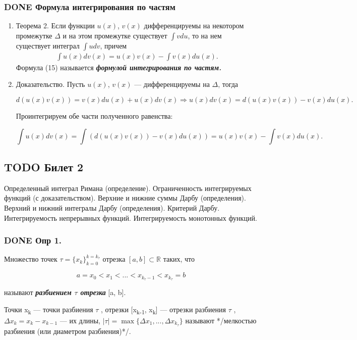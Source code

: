\documentclass[11pt]{article}
\begin{document}
\subsubsection{{\bfseries\sffamily DONE} Формула интегрирования по частям}
\label{sec:orge1b7a90}
\begin{enumerate}
\item Теорема 2.
\label{sec:org81cf2aa}
Если функции \(u(x)\), \(v(x)\) дифференцируемы на некотором промежутке
\(\Delta\) и на этом промежутке существует \(\int vdu\), то на нем существует интеграл 
\(\int udv\), причем
\begin{eqnarray}
\int u(x)dv(x)=u(x)v(x)-\int v(x)du(x).
\end{eqnarray}
Формула (15) называется \textbf{\emph{формулой интегрирования по частям.}}
\item Доказательство.
\label{sec:orgb06381d}
Пусть \(u(x)\), \(v(x)\) — дифференцируемы на \(\Delta\), тогда

$$
d(u(x)v(x))=v(x)du(x)+u(x)dv(x)\Rightarrow u(x)dv(x)=d(u(x)v(x))-v(x)du(x).
$$

Проинтегрируем обе части полученного равенства:

$$
\int u(x)dv(x)=\int(d(u(x)v(x))-v(x)du(x))=u(x)v(x)-\int v(x)du(x).
$$
\end{enumerate}

\subsection{{\bfseries\sffamily TODO} Билет 2}
\label{sec:orgc316861}
Определенный интеграл Римана (определение). Ограниченность интегрируемых функций (с доказательством). Верхние и нижние суммы Дарбу (определения). Верхний и нижний интегралы Дарбу (определения). Критерий Дарбу. Интегрируемость непрерывных функций. Интегрируемость монотонных функций.

\subsubsection{{\bfseries\sffamily DONE} Опр 1.}
\label{sec:orgbe8f39c}
Множество точек \(\tau=\{x_k\}_{k=0}^{k=k_\tau}\) отрезка \([a,b]\subset \mathbb{R}\) таких, что

$$
a=x_0 < x_1 < ... < x_{k_\tau-1} < x_{k_\tau} = b
$$

называют \textbf{\emph{разбиением \(\tau\) отрезка}} [a, b]. 

Точки x\textsubscript{k} — точки разбиения \(\tau\) , отрезки [x\textsubscript{k-1}, x\textsubscript{k}]
 — отрезки разбиения \(\tau\) , \(\Delta x_k = x_k − x_{k-1}\) — их длины, \(|\tau | = \max \{\Delta x_1 ,... , \Delta x_{k_\tau}\}\) называют */мелкостью разбиения (или диаметром разбиения)*/.
\end{document}

